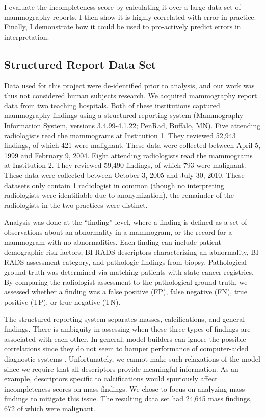 I evaluate the incompleteness score by calculating it over a large data set of mammography reports. I then show it is highly correlated with error in practice. Finally, I demonstrate how it could be used to pro-actively predict errors in interpretation.

\subsection{Structured Report Data Set}
Data used for this project were de-identified prior to analysis, and our work was thus not considered human subjects research. We acquired mammography report data from two teaching hospitals. Both of these institutions captured mammography findings using a structured reporting system (Mammography Information System, versions 3.4.99-4.1.22; PenRad, Buffalo, MN). Five attending radiologists read the mammograms at Institution 1. They reviewed 52,943 findings, of which 421 were malignant. These data were collected between April 5, 1999 and February 9, 2004. Eight attending radiologists read the mammograms at Institution 2. They reviewed 59,490 findings, of which 793 were malignant. These data were collected between October 3, 2005 and July 30, 2010. These datasets only contain 1 radiologist in common (though no interpreting radiologists were identifiable due to anonymization), the remainder of the radiologists in the two practices were distinct.

Analysis was done at the ``finding'' level, where a finding is defined as a set of observations about an abnormality in a mammogram, or the record for a mammogram with no abnormalities. Each finding can include patient demographic risk factors, BI-RADS descriptors characterizing an abnormality, BI-RADS assessment category, and pathologic findings from biopsy. Pathological ground truth was determined via matching patients with state cancer registries. By comparing the radiologist assessment to the pathological ground truth, we assessed whether a finding was a false positive (FP), false negative (FN), true positive (TP), or true negative (TN).

The structured reporting system separates masses, calcifications, and general findings. There is ambiguity in assessing when these three types of findings are associated with each other. In general, model builders can ignore the possible correlations since they do not seem to hamper performance of computer-aided diagnostic systems \cite{Burnside:2000wl, ElizabethS:2005gc, Burnside:2009br}. Unfortunately, we cannot make such relaxations of the model since we require that all descriptors provide meaningful information. As an example, descriptors specific to calcifications would spuriously affect incompleteness scores on mass findings. We chose to focus on analyzing mass findings to mitigate this issue. The resulting data set had 24,645 mass findings, 672 of which were malignant.

